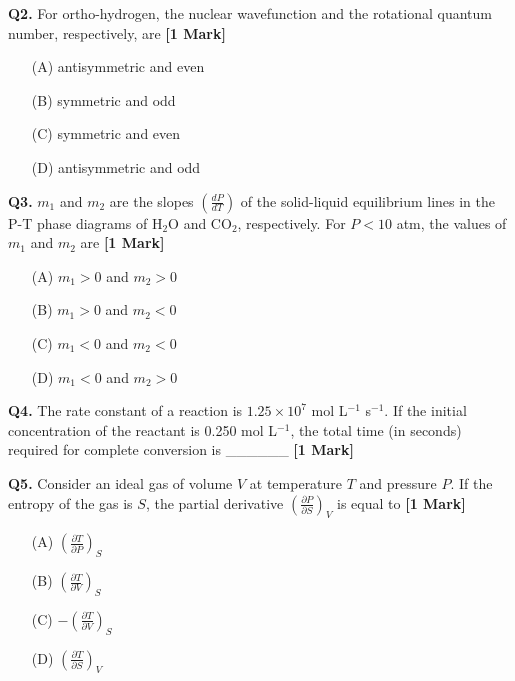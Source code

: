 \documentclass[11pt]{article}
\newcommand{\questiona}[2]{
    \noindent\textbf{Q#2.} #1 \hfill \textbf{[1 Mark]}
}
\begin{document}
\questiona{For ortho-hydrogen, the nuclear wavefunction and the rotational quantum number, respectively, are}{2}
\begin{enumerate}
    \item[(A)] antisymmetric and even
    \item[(B)] symmetric and odd
    \item[(C)] symmetric and even
    \item[(D)] antisymmetric and odd
\end{enumerate}
\vspace{0.5cm}

\questiona{\( m_1 \) and \( m_2 \) are the slopes \((\frac{dP}{dT})\) of the solid-liquid equilibrium lines in the P-T phase diagrams of H\(_2\)O and CO\(_2\), respectively. For \( P < 10 \) atm, the values of \( m_1 \) and \( m_2 \) are}{3}
\begin{enumerate}
    \item[(A)] \( m_1 > 0 \) and \( m_2 > 0 \)
    \item[(B)] \( m_1 > 0 \) and \( m_2 < 0 \)
    \item[(C)] \( m_1 < 0 \) and \( m_2 < 0 \)
    \item[(D)] \( m_1 < 0 \) and \( m_2 > 0 \)
\end{enumerate}
\vspace{0.5cm}

\questiona{The rate constant of a reaction is \( 1.25 \times 10^7 \) mol L\(^{-1}\) s\(^{-1}\). If the initial concentration of the reactant is 0.250 mol L\(^{-1}\), the total time (in seconds) required for complete conversion is \_\_\_\_\_\_}{4}
\vspace{0.5cm}

\questiona{Consider an ideal gas of volume \( V \) at temperature \( T \) and pressure \( P \). If the entropy of the gas is \( S \), the partial derivative \( \left( \frac{\partial P}{\partial S} \right)_V \) is equal to}{5}
\begin{enumerate}
    \item[(A)] \( \left( \frac{\partial T}{\partial P} \right)_S \)
    \item[(B)] \( \left( \frac{\partial T}{\partial V} \right)_S \)
    \item[(C)] \( - \left( \frac{\partial T}{\partial V} \right)_S \)
    \item[(D)] \( \left( \frac{\partial T}{\partial S} \right)_V \)
\end{enumerate}
\vspace{0.5cm}
\end{document}
